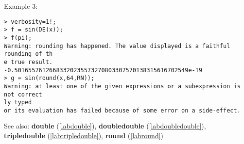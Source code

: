 \noindent Example 3: 
\begin{center}\begin{minipage}{15cm}\begin{Verbatim}[frame=single]
> verbosity=1!;
> f = sin(DE(x));
> f(pi);
Warning: rounding has happened. The value displayed is a faithful rounding of th
e true result.
-0.50165576126683320235573270803307570138315616702549e-19
> g = sin(round(x,64,RN));
Warning: at least one of the given expressions or a subexpression is not correct
ly typed
or its evaluation has failed because of some error on a side-effect.
\end{Verbatim}
\end{minipage}\end{center}
See also: \textbf{double} (\ref{labdouble}), \textbf{doubledouble} (\ref{labdoubledouble}), \textbf{tripledouble} (\ref{labtripledouble}), \textbf{round} (\ref{labround})
